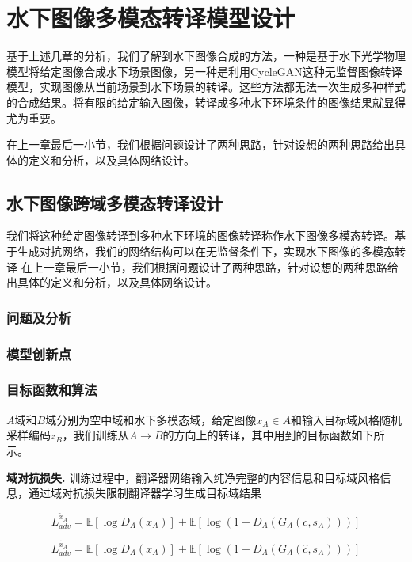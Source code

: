\chapter{水下图像多模态转译模型设计}
基于上述几章的分析，我们了解到水下图像合成的方法，一种是基于水下光学物理模型将给定图像合成水下场景图像，另一种是利用CycleGAN这种无监督图像转译模型，实现图像从当前场景到水下场景的转译。这些方法都无法一次生成多种样式的合成结果。将有限的给定输入图像，转译成多种水下环境条件的图像结果就显得尤为重要。

在上一章最后一小节，我们根据问题设计了两种思路，针对设想的两种思路给出具体的定义和分析，以及具体网络设计。

\section{水下图像跨域多模态转译设计}

我们将这种给定图像转译到多种水下环境的图像转译称作水下图像多模态转译。基于生成对抗网络，我们的网络结构可以在无监督条件下，实现水下图像的多模态转译
在上一章最后一小节，我们根据问题设计了两种思路，针对设想的两种思路给出具体的定义和分析，以及具体网络设计。

\subsection{问题及分析}
\subsection{模型创新点}
\subsection{目标函数和算法}
$A$域和$B$域分别为空中域和水下多模态域，给定图像$x_A \in A$和输入目标域风格随机采样编码$z_B$，我们训练从$A \rightarrow B$的方向上的转译，其中用到的目标函数如下所示。

\textbf{域对抗损失.} 训练过程中，翻译器网络输入纯净完整的内容信息和目标域风格信息，通过域对抗损失限制翻译器学习生成目标域结果

\begin{equation}
\label{equ:adv_a_}
L_{adv}^{\tilde{x}_A} = \mathbb{E}[\log D_A(x_A)] + \mathbb{E}[\log(1-D_A(G_A(c,s_A)))]
\end{equation}

\begin{equation}
\label{equ:adv_a}
L_{adv}^{\hat{x}_A} = \mathbb{E}[\log D_A(x_A)] + \mathbb{E}[\log(1-D_A(G_A(\hat{c},s_A)))]
\end{equation}

